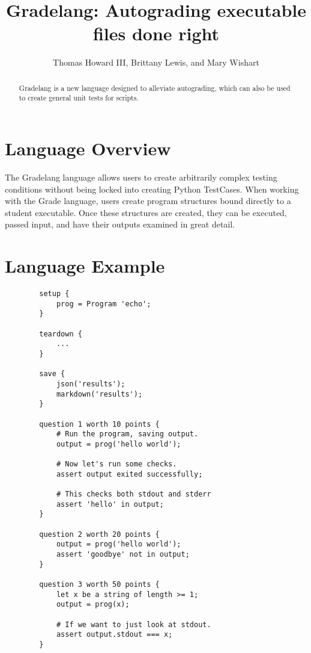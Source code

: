 \documentclass{article}
\title{Gradelang: Autograding executable files done right}
\author{Thomas Howard III, Brittany Lewis, and Mary Wishart}
\begin{document}
    \maketitle

    \begin{abstract}
        Gradelang is a new language designed to alleviate autograding, which can also be used to create general unit tests for scripts.
    \end{abstract}
    
    \section{Language Overview}
    The Gradelang language allows users to create arbitrarily complex testing conditions without being locked into creating Python TestCases.
    When working with the Grade language, users create program structures bound directly to a student executable.
    Once these structures are created, they can be executed, passed input, and have their outputs examined in great detail.
    
      
    \newpage
    \section{Language Example}
    \begin{lstlisting}
        setup {
            prog = Program 'echo';
        }

        teardown {
            ...
        }

        save {
            json('results');
            markdown('results');
        }

        question 1 worth 10 points {
            # Run the program, saving output.
            output = prog('hello world');

            # Now let's run some checks.
            assert output exited successfully;
            
            # This checks both stdout and stderr
            assert 'hello' in output;
        }

        question 2 worth 20 points {
            output = prog('hello world');
            assert 'goodbye' not in output;
        }

        question 3 worth 50 points {
            let x be a string of length >= 1;
            output = prog(x);

            # If we want to just look at stdout.
            assert output.stdout === x;
        }
    \end{lstlisting}
\end{document}
